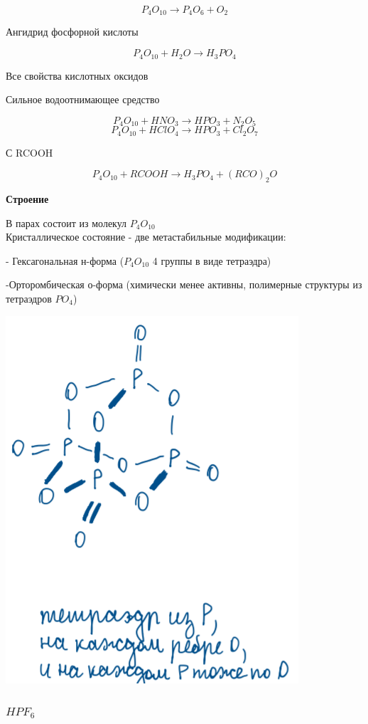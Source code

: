 \documentclass[14pt,a4paper]{scrartcl}
\begin{document}
$$P_4O_{10} \rightarrow P_4O_6 + O_2$$

Ангидрид фосфорной кислоты

$$P_4O_{10} + H_2O \rightarrow H_3PO_4$$

Все свойства кислотных оксидов

Сильное водоотнимающее средство 

$$P_4O_{10} + HNO_3 \rightarrow HPO_3 + N_2O_5$$
$$P_4O_{10} + HClO_4 \rightarrow HPO_3 + Cl_2O_7$$

С RCOOH

$$P_4O_{10} + RCOOH \rightarrow H_3PO_4 + (RCO)_2O$$

\textbf{Строение}

В парах состоит из молекул $P_4O_{10}$\\
Кристаллическое состояние - две метастабильные модификации:

- Гексагональная н-форма ($P_4O_{10}$ 4 группы в виде тетраэдра)

-Орторомбическая о-форма (химически менее активны, полимерные структуры из тетраэдров $PO_4$)

\includegraphics{9v6.png}

\subsubsection{$HPF_6$}
\end{document}
